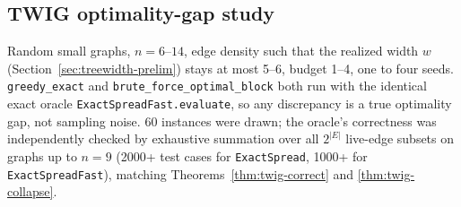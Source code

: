 \documentclass[ijoc,sglanonrev]{informs4}
\begin{document}
\subsection{TWIG optimality-gap study}
Random small graphs, $n=6$--$14$, edge density such that the realized
width $w$ (Section~\ref{sec:treewidth-prelim}) stays at most 5--6, budget
1--4, one to four seeds. \texttt{greedy\_exact} and
\texttt{brute\_force\_optimal\_block} both run with the identical exact
oracle \texttt{ExactSpreadFast.evaluate}, so any discrepancy is a true
optimality gap, not sampling noise. 60 instances were drawn; the oracle's
correctness was independently checked by exhaustive summation over all
$2^{|E|}$ live-edge subsets on graphs up to $n=9$ (2000+ test cases for
\texttt{ExactSpread}, 1000+ for \texttt{ExactSpreadFast}), matching
Theorems~\ref{thm:twig-correct} and \ref{thm:twig-collapse}.
\end{document}
